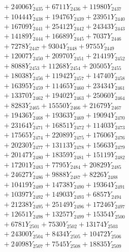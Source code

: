 \documentclass[a4paper,10pt]{article}
\begin{document}
{\begin{align}
&\;  + 24006 Y_{2435} + 6711 Y_{2436} + 11980 Y_{2437} \\[0.3ex]
&\;  + 10444 Y_{2438} + 19476 Y_{2439} + 23951 Y_{2440} \\[0.3ex]
&\;  + 16709 Y_{2441} + 25412 Y_{2442} + 24343 Y_{2443} \\[0.3ex]
&\;  + 14189 Y_{2444} + 16689 Y_{2445} + 7037 Y_{2446} \\[0.3ex]
&\;  + 7278 Y_{2447} + 9304 Y_{2448} + 9755 Y_{2449} \\[0.3ex]
&\;  + 12007 Y_{2450} + 20970 Y_{2451} + 21419 Y_{2452} \\[0.3ex]
&\;  + 8088 Y_{2453} + 11268 Y_{2454} + 20505 Y_{2455} \\[0.3ex]
&\;  + 18038 Y_{2456} + 11942 Y_{2457} + 14740 Y_{2458} \\[0.5ex]\allowbreak
&\;  + 16395 Y_{2459} + 11465 Y_{2460} + 23434 Y_{2461} \\[0.3ex]
&\;  + 13370 Y_{2462} + 19402 Y_{2463} + 25060 Y_{2464} \\[0.3ex]
&\;  + 8283 Y_{2465} + 15550 Y_{2466} + 21679 Y_{2467} \\[0.3ex]
&\;  + 19436 Y_{2468} + 19363 Y_{2469} + 19094 Y_{2470} \\[0.3ex]
&\;  + 23164 Y_{2471} + 16851 Y_{2472} + 11403 Y_{2473} \\[0.3ex]
&\;  + 17565 Y_{2474} + 22089 Y_{2475} + 17606 Y_{2476} \\[0.3ex]
&\;  + 20230 Y_{2477} + 13113 Y_{2478} + 15663 Y_{2479} \\[0.3ex]
&\;  + 20147 Y_{2480} + 18359 Y_{2481} + 15119 Y_{2482} \\[0.3ex]
&\;  + 17201 Y_{2483} + 7795 Y_{2484} + 20829 Y_{2485} \\[0.3ex]
&\;  + 24627 Y_{2486} + 9888 Y_{2487} + 8226 Y_{2488} \\[0.5ex]\allowbreak
&\;  + 10419 Y_{2489} + 14738 Y_{2490} + 19364 Y_{2491} \\[0.3ex]
&\;  + 10397 Y_{2492} + 14903 Y_{2493} + 6857 Y_{2494} \\[0.3ex]
&\;  + 21238 Y_{2495} + 25149 Y_{2496} + 17246 Y_{2497} \\[0.3ex]
&\;  + 12651 Y_{2498} + 13257 Y_{2499} + 15354 Y_{2500} \\[0.3ex]
&\;  + 6781 Y_{2501} + 7530 Y_{2502} + 13174 Y_{2503} \\[0.3ex]
&\;  + 24300 Y_{2504} + 8434 Y_{2505} + 10472 Y_{2506} \\[0.3ex]
&\;  + 24098 Y_{2507} + 7545 Y_{2508} + 18835 Y_{2509} \\[0.3ex]

\end{align}}
\end{document}

